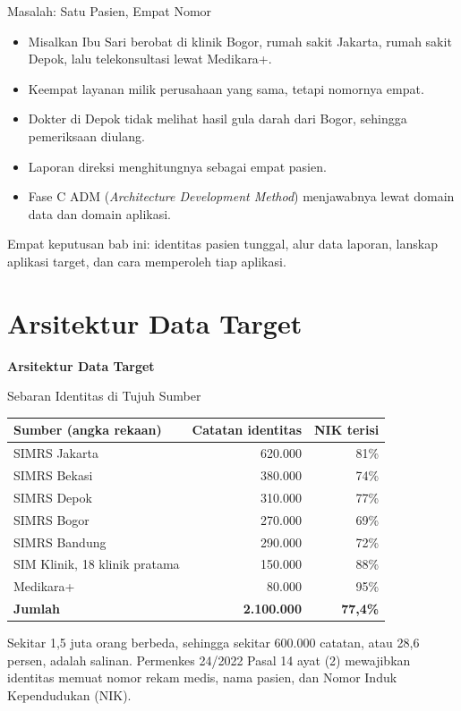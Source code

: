 \documentclass[aspectratio=169, table, 12pt]{beamer}
\begin{document}
\begin{frame}{{\Large Masalah: Satu Pasien, Empat Nomor}}
  \small
  \vspace{6pt}
  \begin{itemize}
    \item Misalkan Ibu Sari berobat di klinik Bogor, rumah sakit Jakarta, rumah sakit Depok, lalu
          telekonsultasi lewat Medikara+.
    \item Keempat layanan milik perusahaan yang sama, tetapi nomornya empat.
    \item Dokter di Depok tidak melihat hasil gula darah dari Bogor, sehingga pemeriksaan diulang.
    \item Laporan direksi menghitungnya sebagai empat pasien.
    \item Fase C ADM (\textit{Architecture Development Method}) menjawabnya lewat domain data dan
          domain aplikasi.
  \end{itemize}
  \vspace{6pt}
  Empat keputusan bab ini: identitas pasien tunggal, alur data laporan, lanskap aplikasi target,
  dan cara memperoleh tiap aplikasi.
\end{frame}

\section{Arsitektur Data Target}

\begin{frame}{\hfill}
  \centering
  \Huge{\textbf{Arsitektur Data Target}}
\end{frame}

\begin{frame}{{\Large Sebaran Identitas di Tujuh Sumber}}
  \footnotesize
  \begin{tabularx}{\textwidth}{Xrr}
    \hline
    \textbf{Sumber (angka rekaan)} & \textbf{Catatan identitas} & \textbf{NIK terisi} \\
    \hline
    SIMRS Jakarta & 620.000 & 81\% \\
    \hline
    SIMRS Bekasi & 380.000 & 74\% \\
    \hline
    SIMRS Depok & 310.000 & 77\% \\
    \hline
    SIMRS Bogor & 270.000 & 69\% \\
    \hline
    SIMRS Bandung & 290.000 & 72\% \\
    \hline
    SIM Klinik, 18 klinik pratama & 150.000 & 88\% \\
    \hline
    Medikara+ & 80.000 & 95\% \\
    \hline
    \textbf{Jumlah} & \textbf{2.100.000} & \textbf{77,4\%} \\
    \hline
  \end{tabularx}

  \vspace{6pt}
  \small Sekitar 1,5 juta orang berbeda, sehingga sekitar 600.000 catatan, atau 28,6 persen, adalah
  salinan. Permenkes 24/2022 Pasal 14 ayat (2) mewajibkan identitas memuat nomor rekam medis, nama
  pasien, dan Nomor Induk Kependudukan (NIK).
\end{frame}
\end{document}
